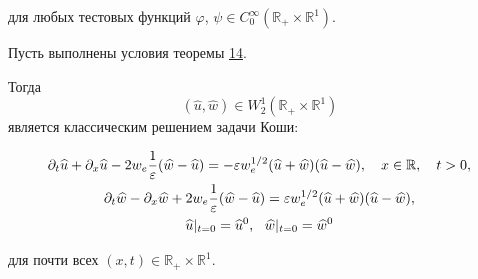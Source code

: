 для любых тестовых функций $\varphi$, $\psi\in C^\infty_0(\mathbb R_{+}\times \mathbb R^1)$.





\smallskip



\begin{theorem}[15]Пусть выполнены условия теоремы {\rm \hyperlink{dukh:th14}{14}.} 

Тогда $${(\widehat{u}, \widehat{w})\in W^1_2(\mathbb R_{+} \times \mathbb R^1)}$$ является классическим решением задачи Коши{\rm\/:}	

\begin{gather}

\pa_t\widehat{u}+\pa_x\widehat{u}-2w_e\frac1\ve(\widehat{w}

-\widehat{u})=-\ve w_e^{1/2}(\widehat{u}+\widehat{w})(\widehat{u}-\widehat{w}),\quad x\in \mathbb R,\quad t>0,

\\

\pa_t\widehat{w}-\pa_x\widehat{w}+2w_e\frac1\ve(\widehat{w}

-\widehat{u})=\ve w_e^{1/2}(\widehat{u}+\widehat{w})(\widehat{u}-\widehat{w}),

\\

\widehat{u}|_{t=0}=\widehat{u}^0,~~\widehat{w}|_{t=0}=\widehat{w}^0

\label{duh:1KarlemS}

\end{gather}

для почти всех $(x,t)\in \mathbb R_{+}\times \mathbb R^1$.

\end{theorem}



\smallskip



